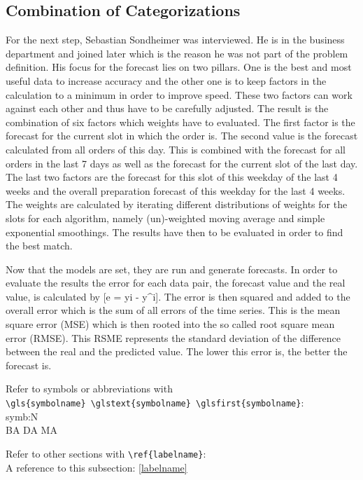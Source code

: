 \subsection{Combination of Categorizations}\label{subsection:Categorizing by Order}
For the next step, Sebastian Sondheimer was interviewed. He is in the business department and joined later which is the reason he was not part of the problem definition. His focus for the forecast lies on two pillars. One is the best and most useful data to increase accuracy and the other one is to keep factors in the calculation to a minimum in order to improve speed. These two factors can work against each other and thus have to be carefully adjusted. The result is the combination of six factors which weights have to evaluated. The first factor is the forecast for the current slot in which the order is. The second value is the forecast calculated from all orders of this day. This is combined with the forecast for all orders in the last 7 days as well as the forecast for the current slot of the last day. The last two factors are the forecast for this slot of this weekday of the last 4 weeks and the overall preparation forecast of this weekday for the last 4 weeks. The weights are calculated by iterating different distributions of weights for the slots for each algorithm, namely (un)-weighted moving average and simple exponential smoothings. The results have then to be evaluated in order to find the best match.

Now that the models are set, they are run and generate forecasts. In order to evaluate the results the error for each data pair, the forecast value and the real value, is calculated by [e = yi - y^i]. The error is then squared and added to the overall error which is the sum of all errors of the time series. This is the mean square error (MSE) which is then rooted into the so called root square mean error (RMSE). This RSME represents the standard deviation of the difference between the real and the predicted value. The lower this error is, the better the forecast is.

Refer to symbols or abbreviations with\\\verb+\gls{symbolname} \glstext{symbolname} \glsfirst{symbolname}+:\\
\gls{symb:N}  \\
\gls{BA} \gls{DA} \gls{MA}

Refer to other sections with \verb+\ref{labelname}+:\\
A reference to this subsection: \ref{labelname}

